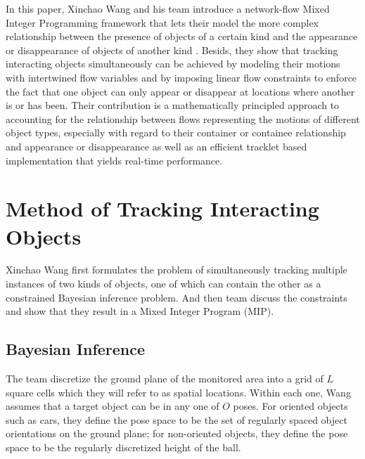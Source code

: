 \documentclass[10pt,twocolumn,letterpaper]{article}
\begin{document}
In this paper, Xinchao Wang and his team introduce a network-flow Mixed Integer Programming framework that lets their model the more complex relationship between the presence of objects of a certain kind and the appearance or disappearance of objects of another kind \cite{Wang2015Tracking}. Besids, they show that tracking interacting objects simultaneously can be achieved by modeling their motions with intertwined flow variables and by imposing linear flow constraints to enforce the fact that one object can only appear or disappear at locations where another is or has been. Their contribution is a mathematically principled approach to accounting for the relationship between flows representing the motions of different object types, especially with regard to their container or containee relationship and appearance or disappearance as well as an efficient tracklet based implementation that yields real-time performance.

\section{Method of Tracking Interacting Objects}

Xinchao Wang first formulates the problem of simultaneously tracking multiple instances of two kinds of objects, one of which can contain the other as a constrained Bayesian inference problem. And then team discuss the constraints and show that they result in a Mixed Integer Program (MIP).

\subsection{Bayesian Inference}

The team discretize the ground plane of the monitored area into a grid of $L$ square cells which they will refer to as spatial locations. Within each one, Wang assumes that a target object can be in any one of $O$ poses. For oriented objects such as cars, they define the pose space to be the set of regularly spaced object orientations on the ground plane; for non-oriented objects, they define the pose space to be the regularly discretized height of the ball.
\end{document}
